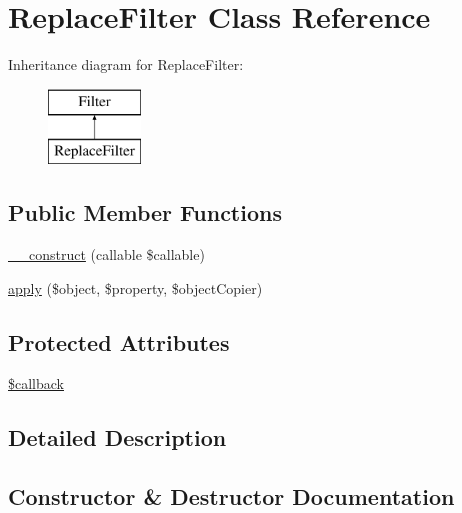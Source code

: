 \hypertarget{class_deep_copy_1_1_filter_1_1_replace_filter}{}\section{Replace\+Filter Class Reference}
\label{class_deep_copy_1_1_filter_1_1_replace_filter}
Inheritance diagram for Replace\+Filter\+:\begin{figure}[H]
\begin{center}
\leavevmode
\includegraphics[height=2.000000cm]{class_deep_copy_1_1_filter_1_1_replace_filter}
\end{center}
\end{figure}
\subsection*{Public Member Functions}
\begin{DoxyCompactItemize}
\item 
\mbox{\hyperlink{class_deep_copy_1_1_filter_1_1_replace_filter_aebfa7ad9f5ca8a07ffa97a0685aea51a}{\+\_\+\+\_\+construct}} (callable \$callable)
\item 
\mbox{\hyperlink{class_deep_copy_1_1_filter_1_1_replace_filter_a360932fe7f9488472623d76aa7da2a25}{apply}} (\$object, \$property, \$object\+Copier)
\end{DoxyCompactItemize}
\subsection*{Protected Attributes}
\begin{DoxyCompactItemize}
\item 
\mbox{\hyperlink{class_deep_copy_1_1_filter_1_1_replace_filter_abc7c2ac0d93d22f71221e8b60512c860}{\$callback}}
\end{DoxyCompactItemize}


\subsection{Detailed Description}


\subsection{Constructor \& Destructor Documentation}
\mbox{\label{class_deep_copy_1_1_filter_1_1_replace_filter_aebfa7ad9f5ca8a07ffa97a0685aea51a}} 
